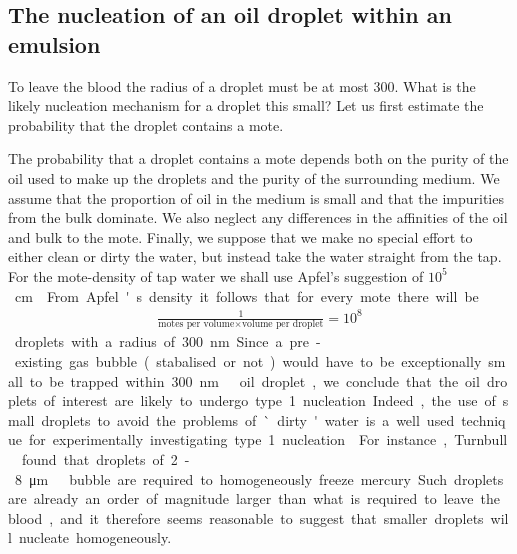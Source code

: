 \subsection{The nucleation of an oil droplet within an emulsion}


To leave the blood the radius of a droplet must be at  most  \unit{300}\nano\metre.
What is the likely nucleation mechanism for a droplet this small?
Let us first estimate the probability that the droplet contains a mote.

The probability that a droplet contains a mote depends both on the purity of the oil used to make up the droplets
and the purity of the surrounding medium.
We assume that the proportion of oil in the medium is small and that the impurities from the bulk dominate.
We also neglect any differences in the affinities of the oil and bulk to the mote.
Finally, we suppose that we make no special effort to either clean or dirty the water,
but instead take the water straight from the tap.
For the mote-density of tap water we shall use Apfel's\cite{Apfel1984} suggestion  of \unit{$10^5$}\centi\metre\rpcubed.

From Apfel's density it follows that for every mote there will be
\begin{align}
\frac{1}{\text{motes per volume}\times\text{volume per droplet}} = 10^8
\end{align} 
droplets with a radius of \unit{300}\nano\metre.
Since a pre-existing gas bubble (stabalised or not) would have to be exceptionally small to be trapped within \unit{300}\nano\metre\ oil droplet,
we conclude that  the oil droplets of interest are  likely to undergo type 1 nucleation.
Indeed, the use of small droplets to avoid the problems of `dirty' water is  a well used technique for experimentally investigating type 1 nucleation\cite{Turnbull1952, HongChul2005,Apfel1984}.
For instance, Turnbull\cite{1952} found that droplets of 2-\unit{8}\micro\metre\ bubble are required to homogeneously freeze mercury.  
Such droplets are already an order of magnitude larger than what is required to leave the blood,
and it therefore seems reasonable to suggest that smaller droplets will nucleate homogeneously.




